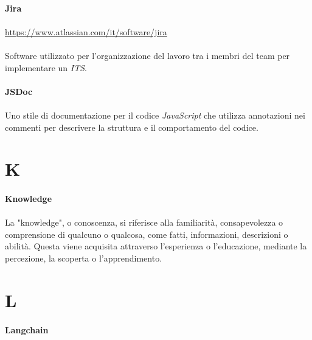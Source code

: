 \documentclass[10pt, a4paper]{article}
\begin{document}
\paragraph{Jira}\noindent\hrulefill
\paragraph{}\href{https://www.atlassian.com/it/software/jira}{https://www.atlassian.com/it/software/jira}\\\\
Software utilizzato per l'organizzazione del lavoro tra i membri del team per implementare un \textit{ITS\pg}.

\vspace{2em}
\paragraph{JSDoc}\noindent\hrulefill
\paragraph{}Uno stile di documentazione per il codice \textit{JavaScript\pg} che utilizza annotazioni nei commenti per descrivere la struttura e il comportamento del codice.




\newpage
\section{K}
\vspace{2em}
\paragraph{Knowledge}\noindent\hrulefill
\paragraph{}La "knowledge", o conoscenza, si riferisce alla familiarità, consapevolezza o comprensione di qualcuno o qualcosa, come fatti, informazioni, descrizioni o abilità. Questa viene acquisita attraverso l’esperienza o l’educazione, mediante la percezione, la scoperta o l’apprendimento.



\newpage
\section{L}
\vspace{2em}
\paragraph{Langchain}\noindent\hrulefill
\end{document}
